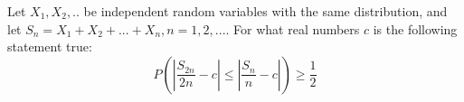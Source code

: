 Let $X_1,X_2,..$ be independent random variables with the same distribution, and let $S_n=X_1+X_2+...+X_n, n=1,2,...$. For what real numbers $c$ is the following statement true:
$$P\left(\left| \frac{S_{2n}}{2n}- c \right| \leqslant \left| \frac{S_n}{n}-c\right| \right)\geqslant \frac{1}{2}$$